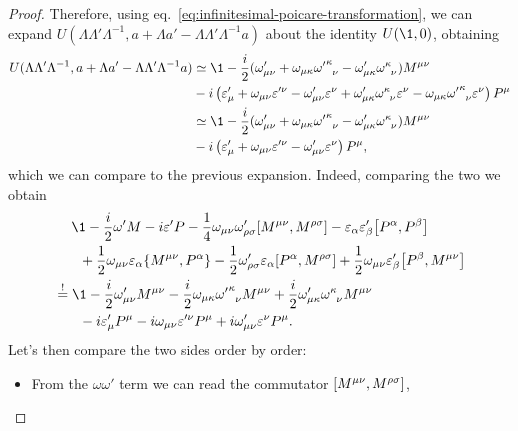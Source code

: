 \begin{proof}
    Therefore, using eq.~\eqref{eq:infinitesimal-poicare-transformation}, we can expand $U(\Lambda\Lambda'\Lambda^{-1},a + \Lambda a' - \Lambda\Lambda'\Lambda^{-1}a)$ about the identity $U(\1,0)$, obtaining
    \begin{align*}
        U(\Lambda\Lambda'\Lambda^{-1},a + \Lambda a' - \Lambda\Lambda'\Lambda^{-1}a) &\simeq \1 - \frac{i}{2} (\omega'_{\mu\nu} + \omega_{\mu\kappa}\tensor{{\omega'}}{^\kappa_\nu}-\omega'_{\mu\kappa} \tensor{\omega}{^\kappa_\nu})M^{\mu\nu} \\
        &- i \left( \epsilon'_\mu +\omega_{\mu\nu} \epsilon'^\nu - \omega'_{\mu\nu} \epsilon^\nu + \omega'_{\mu\kappa}\tensor{\omega}{^\kappa_\nu} \epsilon^\nu - \omega_{\mu\kappa} \tensor{{\omega'}}{^\kappa_\nu} \epsilon^\nu \right) P^\mu \\
        &\simeq \1 - \frac{i}{2} (\omega'_{\mu\nu} + \omega_{\mu\kappa}\tensor{{\omega'}}{^\kappa_\nu}-\omega'_{\mu\kappa} \tensor{\omega}{^\kappa_\nu})M^{\mu\nu} \\
        &- i \left( \epsilon'_\mu +\omega_{\mu\nu} \epsilon'^\nu - \omega'_{\mu\nu} \epsilon^\nu\right) P^\mu ,
    \end{align*}
    which we can compare to the previous expansion. Indeed, comparing the two we obtain
    \begin{align*}
        &\;\quad \1 -\frac{i}{2} \omega' M - i \epsilon' P 
        - \frac{1}{4} \omega_{\mu\nu} \omega'_{\rho\sigma} \comm{M^{\mu\nu}}{M^{\rho\sigma}} 
        - \epsilon_\alpha \epsilon'_\beta \comm{P^\alpha}{P^\beta} \\
        &\;\quad\;\; +\frac{1}{2} \omega_{\mu\nu} \epsilon_\alpha \{ M^{\mu\nu}, P^\alpha \} - \frac{1}{2} \omega'_{\rho\sigma} \epsilon_\alpha \comm{P^\alpha}{M^{\rho\sigma}} + \frac{1}{2} \omega_{\mu\nu} \epsilon'_\beta \comm{P^\beta}{M^{\mu\nu}} \\
        &\overset{!}{=} \1 - \frac{i}{2} \omega'_{\mu\nu} M^{\mu\nu} - \frac{i}{2} \omega_{\mu\kappa}\tensor{{\omega'}}{^\kappa_\nu} M^{\mu\nu} + \frac{i}{2} \omega'_{\mu\kappa} \tensor{\omega}{^\kappa_\nu} M^{\mu\nu} \\
        &\quad\;\;\;  - i \epsilon'_\mu P^\mu - i \omega_{\mu\nu} \epsilon'^\nu P^\mu + i \omega'_{\mu\nu} \epsilon^\nu P^\mu   .
    \end{align*}
    Let's then compare the two sides order by order:
    \begin{itemize}
        \item From the $\omega\omega'$ term we can read the commutator $\comm{M^{\mu\nu}}{M^{\rho\sigma}}$,

\end{itemize}
\end{proof}
